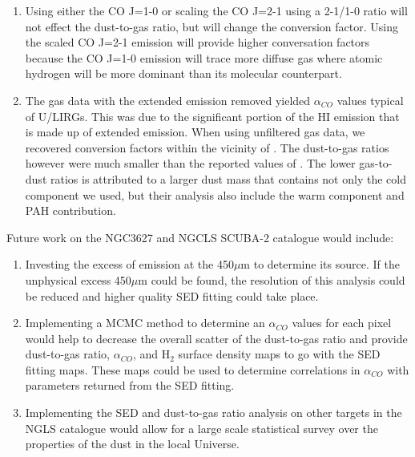 \begin{enumerate}
\item{Using either the CO J=1-0 or scaling the CO J=2-1 using a 2-1/1-0 ratio will not effect the dust-to-gas ratio, but will change the conversion factor.  Using the scaled CO J=2-1 emission will provide higher conversation factors because the CO J=1-0 emission will trace more diffuse gas \citep{wilson1990} where atomic hydrogen will be more dominant than its molecular counterpart.}

\item{The gas data with the extended emission removed yielded $\alpha_{CO}$ values typical of U/LIRGs.  This was due to the significant portion of the HI emission that is made up of extended emission.  When using unfiltered gas data, we recovered conversion factors within the vicinity of \cite{sandstrom2013}.  The dust-to-gas ratios however were much smaller than the reported values of \cite{sandstrom2013}.  The lower gas-to-dust ratios is attributed to a larger dust mass that contains not only the cold component we used, but their analysis also include the warm component and PAH contribution.}

\end{enumerate}

Future work on the NGC3627 and NGCLS SCUBA-2 catalogue would include:

\begin{enumerate}

\item{Investing the excess of emission at the 450$\mu$m to determine its source.  If the unphysical excess 450$\mu$m could be found, the resolution of this analysis could be reduced and higher quality SED fitting could take place.}

\item{Implementing a MCMC method to determine an $\alpha_{CO}$ values for each pixel would help to decrease the overall scatter of the dust-to-gas ratio and provide dust-to-gas ratio, $\alpha_{CO}$, and H$_2$ surface density maps to go with the SED fitting maps.  These maps could be used to determine correlations in $\alpha_{CO}$ with parameters returned from the SED fitting.}

\item{Implementing the SED and dust-to-gas ratio analysis on other targets in the NGLS catalogue would allow for a large scale statistical survey over the properties of the dust in the local Universe.}

\end{enumerate}